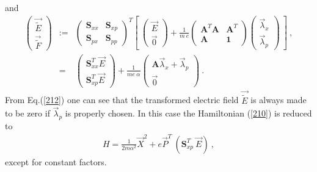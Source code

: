 \documentclass[a4paper,seceq]{ptptex}
\newcommand{\bfA}{ \boldsymbol{A} }
\newcommand{\bfS}{ \boldsymbol{S} }
\newcommand{\vecE}{ {\vec E} }
\newcommand{\vecP}{ {\vec P} }
\newcommand{\vecX}{ {\vec X} }
\newcommand{\veclam}{ {\vec \lambda} }
\newcommand{\tilE}{ \tilde{E} }
\newcommand{\tilF}{ \tilde{F} }
\newcommand{\vectilE}{ \vec{\tilE} }
\newcommand{\vectilF}{ \vec{\tilF} }
\newcommand{\DEF}{:=}
\begin{document}
and
\begin{eqnarray}
 \begin{pmatrix} \vectilE \\ \vectilF \end{pmatrix} &\DEF&
      \begin{pmatrix} \bfS_{xx} & \bfS_{xp} \\
                      \bfS_{px} & \bfS_{pp} \end{pmatrix}^T
 \left[~ \begin{pmatrix} \vecE \\ \vec{0} \end{pmatrix}
    + \frac{1}{m~e} \begin{pmatrix}
                          \bfA^T \bfA & \bfA^T \\
                                 \bfA & \boldsymbol{1} \end{pmatrix}
      \begin{pmatrix} \veclam_x \\ \veclam_p \end{pmatrix}~\right]~,
\label{eq:def-tilEF} \nonumber \\
  &=& \begin{pmatrix} \bfS_{xx}^T \vecE \\
                      \bfS_{xp}^T \vecE \end{pmatrix}
    + \frac{1}{m e~\alpha}
        \begin{pmatrix} \bfA \veclam_x + \veclam_p \\
                                          {\vec 0} \end{pmatrix}~.
\label{212}
\end{eqnarray}
From Eq.(\ref{212}) one can see that the transformed electric field
$\vectilE$ is always made to be zero if $\veclam_p$ is properly chosen.
In this case the Hamiltonian (\ref{210}) is reduced to
\begin{eqnarray}
  H = \frac{1}{2m \alpha^2}  \vecX^2
    + e \vecP^T~\left( \bfS_{xp}^T~\vecE \right)~,
\label{213}
\end{eqnarray}
except for constant factors.
\end{document}
